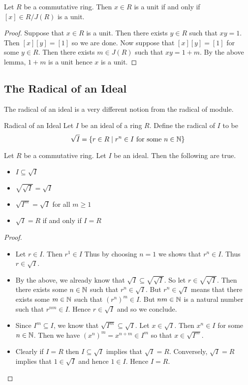 \documentclass[a4paper]{article}
\begin{document}
\begin{lmm}{}{} Let $R$ be a commutative ring. Then $x\in R$ is a unit if and only if $[x]\in R/J(R)$ is a unit. 
\begin{proof}
Suppose that $x\in R$ is a unit. Then there exists $y\in R$ such that $xy=1$. Then $[x][y]=[1]$ so we are done. Now suppose that $[x][y]=[1]$ for some $y\in R$. Then there exists $m\in J(R)$ such that $xy=1+m$. By the above lemma, $1+m$ is a unit hence $x$ is a unit. 
\end{proof}
\end{lmm}

\subsection{The Radical of an Ideal}
The radical of an ideal is a very different notion from the radical of module. 

\begin{defn}{Radical of an Ideal}{} Let $I$ be an ideal of a ring $R$. Define the radical of $I$ to be $$\sqrt{I}=\{r\in R\;|\;r^n\in I\text{ for some }n\in\mathbb{N}\}$$
\end{defn}

\begin{prp}{}{} Let $R$ be a commutative ring. Let $I$ be an ideal. Then the following are true. 
\begin{itemize}
\item $I\subseteq\sqrt{I}$
\item $\sqrt{\sqrt{I}}=\sqrt{I}$
\item $\sqrt{I^m}=\sqrt{I}$ for all $m\geq 1$
\item $\sqrt{I}=R$ if and only if $I=R$
\end{itemize} 
\begin{proof}~\\
\begin{itemize}
\item Let $r\in I$. Then $r^1\in I$ Thus by choosing $n=1$ we shows that $r^n\in I$. Thus $r\in\sqrt{I}$. 
\item By the above, we already know that $\sqrt{I}\subseteq\sqrt{\sqrt{I}}$. So let $r\in\sqrt{\sqrt{I}}$. Then there exists some $n\in\mathbb{N}$ such that $r^n\in\sqrt{I}$. But $r^n\in\sqrt{I}$ means that there exists some $m\in\mathbb{N}$ such that $(r^n)^m\in I$. But $nm\in\mathbb{N}$ is a natural number such that $r^{nm}\in I$. Hence $r\in\sqrt{I}$ and so we conclude. 
\item Since $I^m\subseteq I$, we know that $\sqrt{I^m}\subseteq\sqrt{I}$. Let $x\in\sqrt{I}$. Then $x^n\in I$ for some $n\in\mathbb{N}$. Then we have $(x^n)^m=x^{n+m}\in I^m$ so that $x\in\sqrt{I^m}$. 
\item Clearly if $I=R$ then $I\subseteq\sqrt{I}$ implies that $\sqrt{I}=R$. Conversely, $\sqrt{I}=R$ implies that $1\in\sqrt{I}$ and hence $1\in I$. Hence $I=R$. 
\end{itemize}
\end{proof}
\end{prp}
\end{document}
